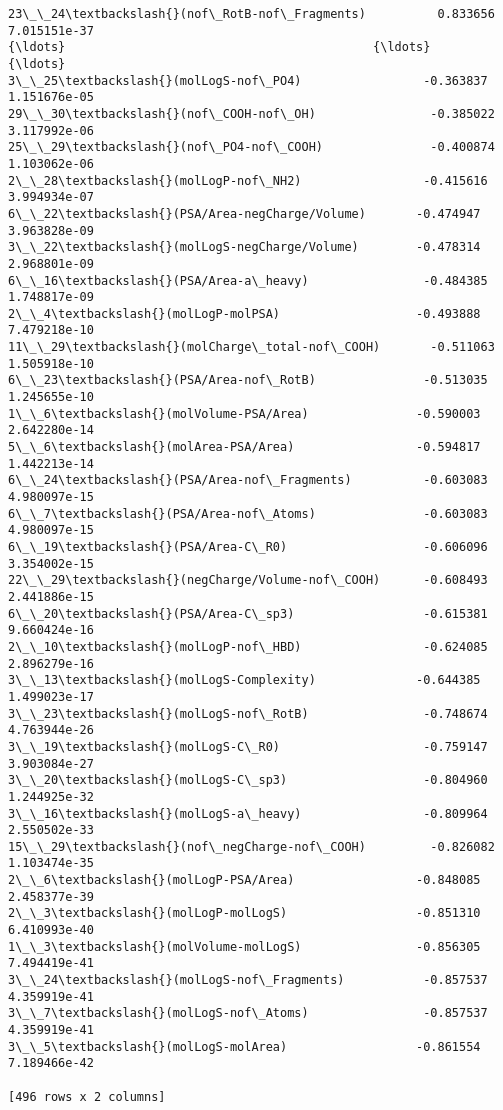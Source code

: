 \documentclass[11pt]{article}
\begin{document}
\begin{Verbatim}[commandchars=\\\{\}]
23\_\_24\textbackslash{}(nof\_RotB-nof\_Fragments)          0.833656   7.015151e-37
{\ldots}                                           {\ldots}            {\ldots}
3\_\_25\textbackslash{}(molLogS-nof\_PO4)                 -0.363837   1.151676e-05
29\_\_30\textbackslash{}(nof\_COOH-nof\_OH)                -0.385022   3.117992e-06
25\_\_29\textbackslash{}(nof\_PO4-nof\_COOH)               -0.400874   1.103062e-06
2\_\_28\textbackslash{}(molLogP-nof\_NH2)                 -0.415616   3.994934e-07
6\_\_22\textbackslash{}(PSA/Area-negCharge/Volume)       -0.474947   3.963828e-09
3\_\_22\textbackslash{}(molLogS-negCharge/Volume)        -0.478314   2.968801e-09
6\_\_16\textbackslash{}(PSA/Area-a\_heavy)                -0.484385   1.748817e-09
2\_\_4\textbackslash{}(molLogP-molPSA)                   -0.493888   7.479218e-10
11\_\_29\textbackslash{}(molCharge\_total-nof\_COOH)       -0.511063   1.505918e-10
6\_\_23\textbackslash{}(PSA/Area-nof\_RotB)               -0.513035   1.245655e-10
1\_\_6\textbackslash{}(molVolume-PSA/Area)               -0.590003   2.642280e-14
5\_\_6\textbackslash{}(molArea-PSA/Area)                 -0.594817   1.442213e-14
6\_\_24\textbackslash{}(PSA/Area-nof\_Fragments)          -0.603083   4.980097e-15
6\_\_7\textbackslash{}(PSA/Area-nof\_Atoms)               -0.603083   4.980097e-15
6\_\_19\textbackslash{}(PSA/Area-C\_R0)                   -0.606096   3.354002e-15
22\_\_29\textbackslash{}(negCharge/Volume-nof\_COOH)      -0.608493   2.441886e-15
6\_\_20\textbackslash{}(PSA/Area-C\_sp3)                  -0.615381   9.660424e-16
2\_\_10\textbackslash{}(molLogP-nof\_HBD)                 -0.624085   2.896279e-16
3\_\_13\textbackslash{}(molLogS-Complexity)              -0.644385   1.499023e-17
3\_\_23\textbackslash{}(molLogS-nof\_RotB)                -0.748674   4.763944e-26
3\_\_19\textbackslash{}(molLogS-C\_R0)                    -0.759147   3.903084e-27
3\_\_20\textbackslash{}(molLogS-C\_sp3)                   -0.804960   1.244925e-32
3\_\_16\textbackslash{}(molLogS-a\_heavy)                 -0.809964   2.550502e-33
15\_\_29\textbackslash{}(nof\_negCharge-nof\_COOH)         -0.826082   1.103474e-35
2\_\_6\textbackslash{}(molLogP-PSA/Area)                 -0.848085   2.458377e-39
2\_\_3\textbackslash{}(molLogP-molLogS)                  -0.851310   6.410993e-40
1\_\_3\textbackslash{}(molVolume-molLogS)                -0.856305   7.494419e-41
3\_\_24\textbackslash{}(molLogS-nof\_Fragments)           -0.857537   4.359919e-41
3\_\_7\textbackslash{}(molLogS-nof\_Atoms)                -0.857537   4.359919e-41
3\_\_5\textbackslash{}(molLogS-molArea)                  -0.861554   7.189466e-42

[496 rows x 2 columns]

    \end{Verbatim}
\end{document}
